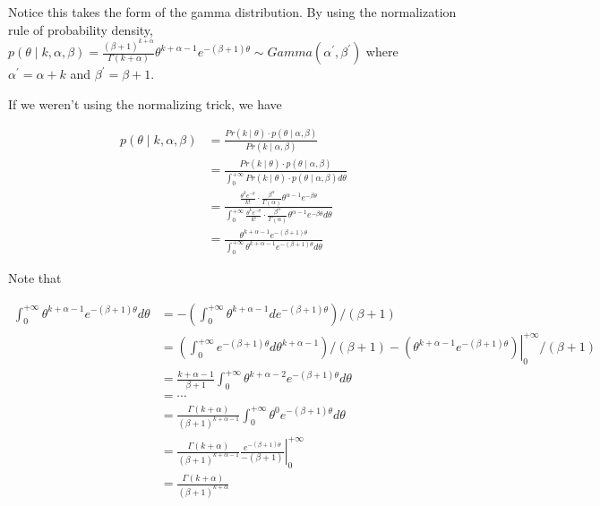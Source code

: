 \documentclass[11pt]{article}
\begin{document}
\begin{enumerate}
    Notice this takes the form of the gamma distribution. By using the normalization rule of probability density, $p(\theta \mid k, \alpha, \beta) = \frac{(\beta+1)^{k+\alpha}}{\Gamma(k+\alpha)} \theta^{k+\alpha-1}e^{-(\beta+1)\theta} \sim Gamma(\alpha^{\prime}, \beta^{\prime})$ where $\alpha^{\prime} = \alpha+k$ and $\beta^{\prime}=\beta+1$.

    If we weren't using the normalizing trick, we have

    $$
    \begin{aligned}
        p(\theta \mid k, \alpha, \beta) 
        &= \frac{Pr(k \mid \theta) \cdot p(\theta \mid \alpha, \beta)}{Pr(k \mid \alpha, \beta)} \\
        &= \frac{Pr(k \mid \theta) \cdot p(\theta \mid \alpha, \beta)}{\int_{0}^{+\infty} Pr(k \mid \theta) \cdot p(\theta \mid \alpha, \beta) d \theta} \\
        &= \frac{\frac{\theta^{k}e^{-\theta}}{k!} \cdot \frac{\beta^{\alpha}}{\Gamma(\alpha)} \theta^{\alpha-1} e^{-\beta\theta}}{\int_{0}^{+\infty} \frac{\theta^{k}e^{-\theta}}{k!} \cdot \frac{\beta^{\alpha}}{\Gamma(\alpha)} \theta^{\alpha-1} e^{-\beta\theta} d \theta} \\
        &= \frac{\theta^{k+\alpha-1}e^{-(\beta+1)\theta}}{\int_{0}^{+\infty} \theta^{k+\alpha-1}e^{-(\beta+1)\theta} d \theta}
    \end{aligned}
    $$

    Note that

    $$
    \begin{aligned}
        \int_{0}^{+\infty} \theta^{k+\alpha-1}e^{-(\beta+1)\theta} d \theta
        &= - \left(\int_{0}^{+\infty} \theta^{k+\alpha-1} d e^{-(\beta+1)\theta}\right) / (\beta + 1) \\
        &= \left(\int_{0}^{+\infty} e^{-(\beta+1)\theta} d \theta^{k+\alpha-1}\right) / (\beta + 1) - \left.\left(\theta^{k+\alpha-1}e^{-(\beta+1)\theta}\right) \right|_{0}^{+\infty} / (\beta + 1) \\
        &= \frac{k+\alpha-1}{\beta + 1} \int_{0}^{+\infty} \theta^{k+\alpha-2} e^{-(\beta+1)\theta} d \theta \\
        &= \cdots \\
        &= \frac{\Gamma(k+\alpha)}{(\beta+1)^{k+\alpha-1}} \int_{0}^{+\infty} \theta^{0}e^{-(\beta+1)\theta} d \theta \\
        &= \frac{\Gamma(k+\alpha)}{(\beta+1)^{k+\alpha-1}} \left.\frac{e^{-(\beta+1)\theta}}{-(\beta+1)}\right|_{0}^{+\infty} \\
        &= \frac{\Gamma(k+\alpha)}{(\beta+1)^{k+\alpha}}
    \end{aligned}
    $$


\end{enumerate}
\end{document}
